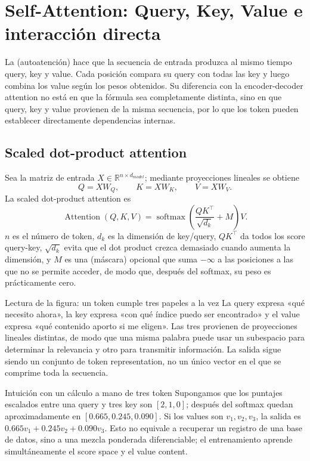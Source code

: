 \section{Self-Attention: Query, Key, Value e interacción directa}

La  (autoatención) hace que la secuencia de entrada produzca al mismo tiempo query, key y value. Cada posición compara su query con todas las key y luego combina los value según los pesos obtenidos. Su diferencia con la encoder-decoder attention no está en que la fórmula sea completamente distinta, sino en que query, key y value provienen de la misma secuencia, por lo que los token pueden establecer directamente dependencias internas.

\subsection{Scaled dot-product attention}

Sea la matriz de entrada $X\in\mathbb{R}^{n\times d_{model}}$; mediante proyecciones lineales se obtiene
\[
Q=XW_Q,\qquad K=XW_K,\qquad V=XW_V.
\]
La scaled dot-product attention es
\[
\operatorname{Attention}(Q,K,V)
=\operatorname{softmax}\!\left(\frac{QK^\top}{\sqrt{d_k}}+M\right)V.
\]
$n$ es el número de token, $d_k$ es la dimensión de key/query, $QK^\top$ da todos los score query-key, $\sqrt{d_k}$ evita que el dot product crezca demasiado cuando aumenta la dimensión, y $M$ es una  (máscara) opcional que suma $-\infty$ a las posiciones a las que no se permite acceder, de modo que, después del softmax, su peso es prácticamente cero.


\begin{knowledgebox}{Lectura de la figura: un token cumple tres papeles a la vez}
La query expresa «qué necesito ahora», la key expresa «con qué índice puedo ser encontrado» y el value expresa «qué contenido aporto si me eligen». Las tres provienen de proyecciones lineales distintas, de modo que una misma palabra puede usar un subespacio para determinar la relevancia y otro para transmitir información. La salida sigue siendo un conjunto de token representation, no un único vector en el que se comprime toda la secuencia.
\end{knowledgebox}

\begin{importantbox}{Intuición con un cálculo a mano de tres token}
Supongamos que los puntajes escalados entre una query y tres key son $[2,1,0]$; después del softmax quedan aproximadamente en $[0.665,0.245,0.090]$. Si los values son $v_1,v_2,v_3$, la salida es $0.665v_1+0.245v_2+0.090v_3$. Esto no equivale a recuperar un registro de una base de datos, sino a una mezcla ponderada diferenciable; el entrenamiento aprende simultáneamente el score space y el value content.
\end{importantbox}

